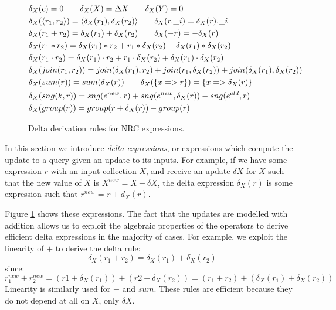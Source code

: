 {{{\begin{figure}
\begin{equation*}
\begin{aligned}
&\delta_X(c) = 0 \qquad \delta_X(X) = \Delta X \qquad \delta_X(Y) = 0\\
&\delta_X(\langle r_1, r_2 \rangle) = \langle \delta_X(r_1), \delta_X(r_2) \rangle \qquad \delta_X(r.\_i) = \delta_X(r).\_i\\
&\delta_X(r_1 + r_2) = \delta_X(r_1) + \delta_X(r_2) \qquad \delta_X(-r) = -\delta_X(r)\\
&\delta_X(r_1 * r_2) = \delta_X(r_1)*r_2 + r_1*\delta_X(r_2) + \delta_X(r_1) * \delta_X(r_2) \\
&\delta_X(r_1 \cdot r_2) = \delta_X(r_1) \cdot r_2 + r_1 \cdot \delta_X(r_2) + \delta_X(r_1) \cdot \delta_X(r_2) \\
&\delta_X(join(r_1,r_2)) = join(\delta_X(r_1),r_2) + join(r_1,\delta_X(r_2)) + join(\delta_X(r_1),\delta_X(r_2)) \\
&\delta_X(sum(r)) = sum(\delta_X(r)) \qquad \delta_X(\{x => r\}) = \{x => \delta_X(r)\} \\
&\delta_X(sng(k,r)) = sng(e^{new},r)  + sng(e^{new},\delta_X(r)) - sng(e^{old},r) \\
&\delta_X(group(r)) = group(r + \delta_X(r)) - group(r)
\end{aligned}
\qquad
\end{equation*}
\caption{Delta derivation rules for NRC expressions.}
\label{deltaexprs}
\end{figure}

In this section we introduce \textit{delta expressions}, or expressions which compute the update to a query given an update to its inputs. For example, if we have some expression $r$ with an input collection $X$, and receive an update $\delta X$ for $X$ such that the new value of $X$ is $X^{new} = X + \delta X$, the delta expression $\delta_X(r)$ is some expression such that $r^{new}$ = $r + d_X(r)$.

Figure \ref{deltaexprs} shows these expressions. The fact that the updates are modelled with addition allows us to exploit the algebraic properties of the operators to derive efficient delta expressions in the majority of cases. For example, we exploit the linearity of $+$ to derive the delta rule:
\[\delta_X(r_1 + r_2) = \delta_X(r_1) + \delta_X(r_2)\]
since: 
\[r_1^{new} + r_2^{new} = (r1 + \delta_X(r_1)) + (r2 + \delta_X(r_2)) = (r_1 + r_2) + (\delta_X(r_1) + \delta_X(r_2))\]
Linearity is similarly used for $-$ and $sum$. These rules are efficient because they do not depend at all on $X$, only $\delta X$.

}}}
